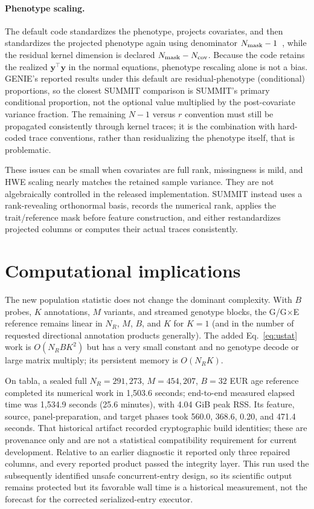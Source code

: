 \documentclass[11pt]{article}
\newcommand{\by}{\bm y}
\begin{document}
\paragraph{Phenotype scaling.}
The default code standardizes the phenotype, projects covariates, and then
standardizes the projected phenotype again using denominator
$N_{\rm mask}-1$~\cite{geniecodepheno}, while the residual kernel dimension is
declared $N_{\rm mask}-N_{\rm cov}$.  Because the code retains the realized
$\by^\top\by$ in the normal equations, phenotype rescaling alone is not a
bias.  GENIE's reported results under this default are residual-phenotype
(conditional) proportions, so the closest SUMMIT comparison is SUMMIT's
primary conditional proportion, not the optional value multiplied by the
post-covariate variance fraction.  The remaining $N-1$ versus $r$ convention
must still be propagated consistently through kernel traces; it is the
combination with hard-coded trace conventions, rather than residualizing the
phenotype itself, that is problematic.

These issues can be small when covariates are full rank, missingness is mild,
and HWE scaling nearly matches the retained sample variance.  They are not
algebraically controlled in the released implementation.  SUMMIT instead uses
a rank-revealing orthonormal basis, records the numerical rank, applies the
trait/reference mask before feature construction, and either restandardizes
projected columns or computes their actual traces consistently.

\section{Computational implications}

The new population statistic does not change the dominant complexity.  With
$B$ probes, $K$ annotations, $M$ variants, and streamed genotype blocks, the
G/G$\times$E reference remains linear in $N_R$, $M$, $B$, and $K$ for $K=1$
(and in the number of requested directional annotation products generally).
The added Eq.~\eqref{eq:ustat} work is $O(N_RBK^2)$ but has a very small
constant and no genotype decode or large matrix multiply; its persistent
memory is $O(N_RK)$.

On tabla, a sealed full $N_R=291{,}273$, $M=454{,}207$, $B=32$ EUR age
reference completed its numerical work in 1,503.6 seconds; end-to-end measured
elapsed time was 1,534.9 seconds (25.6 minutes), with 4.04 GiB peak RSS.  Its
feature, source, panel-preparation, and target phases took 560.0, 368.6, 0.20,
and 471.4 seconds.  That historical artifact recorded cryptographic build
identities; these are provenance only and are not a statistical compatibility
requirement for current development.  Relative
to an earlier diagnostic it reported only three repaired columns, and every
reported product passed the integrity layer.  This run used the subsequently
identified unsafe concurrent-entry design, so its scientific output remains
protected but its favorable wall time is a historical measurement, not the
forecast for the corrected serialized-entry executor.
\end{document}
